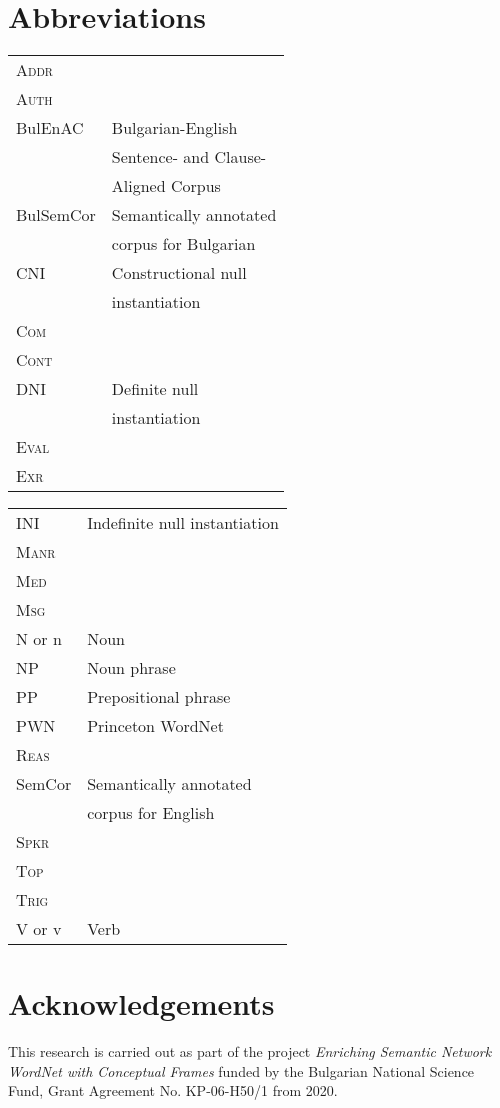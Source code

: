 \documentclass[output=paper,colorlinks,citecolor=brown]{langscibook}
\begin{document}
\section*{Abbreviations}

\begin{tabularx}{.5\textwidth}{lQ}
\scshape Addr & \\
\scshape Auth & \\
BulEnAC & Bulgarian-English \\ & Sentence- and Clause- \\ & Aligned Corpus\\
BulSemCor & Semantically annotated \\ & corpus for Bulgarian\\
CNI & Constructional null \\ & instantiation\\
\scshape Com & \\
\scshape Cont & \\
DNI & Definite null \\ & instantiation\\
\scshape Eval & \\
\scshape Exr & \\
\end{tabularx}%
\begin{tabularx}{.49\textwidth}{lQ}
INI & Indefinite null instantiation\\
\scshape Manr & \\
\scshape Med & \\
\scshape Msg & \\
N or n & Noun\\
NP & Noun phrase\\
PP & Prepositional phrase\\
PWN & Princeton WordNet\\
\scshape Reas & \\
SemCor & Semantically annotated \\ & corpus for English\\
\scshape Spkr & \\
\scshape Top & \\
\scshape Trig & \\
V or v & Verb
\end{tabularx}


\section*{Acknowledgements}

This research is carried out as part of the project \emph{Enriching Semantic Network WordNet with Conceptual Frames} funded by the Bulgarian National Science Fund, Grant Agreement No. KP-06-H50/1 from 2020.


{\sloppy\printbibliography[heading=subbibliography,notkeyword=this]}
\end{document}
